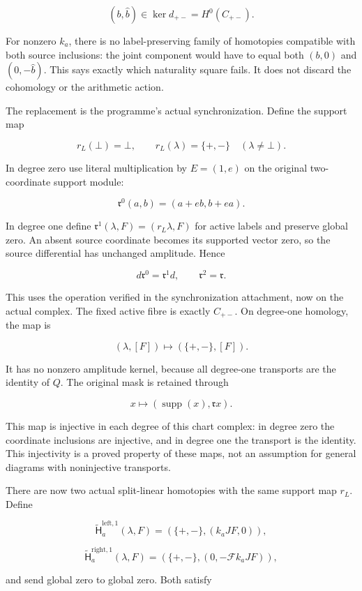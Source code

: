 \[\boxed{(b,\widehat b)\in\ker d_{+-}=H^0(C_{+-}).}\tag{18}\]

For nonzero \(k_a\), there is no label-preserving family of homotopies compatible with both source
inclusions: the joint component would have to equal both \((b,0)\) and \((0,-\widehat b)\). This
says exactly which naturality square fails. It does not discard the cohomology or the arithmetic
action.

The replacement is the programme's actual synchronization. Define the support map

\[r_L(\bot)=\bot,\qquad r_L(\lambda)=\{+,-\}\quad(\lambda\ne\bot).\]

In degree zero use literal multiplication by \(E=(1,e)\) on the original two-coordinate support
module:

\[\mathfrak r^0(a,b)=(a+eb,b+ea).\]

In degree one define \(\mathfrak r^1(\lambda,F)=(r_L\lambda,F)\) for active labels and preserve
global zero. An absent source coordinate becomes its supported vector zero, so the source
differential has unchanged amplitude. Hence

\[\boxed{d\mathfrak r^0=\mathfrak r^1d,\qquad
\mathfrak r^2=\mathfrak r.}\tag{19}\]

This uses the operation verified in the synchronization attachment, now on the actual complex. The
fixed active fibre is exactly \(C_{+-}\). On degree-one homology, the map is

\[(\lambda,[F])\longmapsto(\{+,-\},[F]).\]

It has no nonzero amplitude kernel, because all degree-one transports are the identity of \(Q\). The
original mask is retained through

\[x\longmapsto(\operatorname{supp}(x),\mathfrak r x).\]

This map is injective in each degree of this chart complex: in degree zero the coordinate inclusions
are injective, and in degree one the transport is the identity. This injectivity is a proved
property of these maps, not an assumption for general diagrams with noninjective transports.

There are now two actual split-linear homotopies with the same support map \(r_L\). Define

\[\widetilde{\mathsf H}^{\mathrm{left},1}_a(\lambda,F)
=(\{+,-\},(k_aJF,0)),\]

\[\widetilde{\mathsf H}^{\mathrm{right},1}_a(\lambda,F)
=(\{+,-\},(0,-\mathcal F k_aJF)),\]

and send global zero to global zero. Both satisfy

